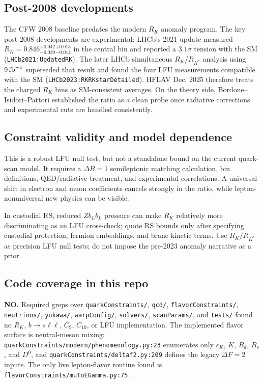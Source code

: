 \subsection*{Post-2008 developments}
The CFW 2008 baseline predates the modern \(R_K\) anomaly program.  The key
post-2008 developments are experimental: LHCb's 2021 update measured
\(R_K=0.846^{+0.042}_{-0.039}{}^{+0.013}_{-0.012}\) in the central bin and
reported a \(3.1\sigma\) tension with the SM
(\texttt{LHCb2021:UpdatedRK}).  The later LHCb simultaneous
\(R_K\)/\(R_{K^*}\) analysis using \(9\,{\rm fb}^{-1}\) superseded that result
and found the four LFU measurements compatible with the SM
(\texttt{LHCb2023:RKRKstarDetailed}).  HFLAV Dec. 2025 therefore treats the
charged \(R_K\) bins as SM-consistent averages.  On the theory side,
Bordone--Isidori--Pattori established the ratio as a clean probe once
radiative corrections and experimental cuts are handled consistently.

\subsection*{Constraint validity and model dependence}
This is a robust LFU null test, but not a standalone bound on the current
quark-scan model.  It requires a \(\Delta B=1\) semileptonic matching
calculation, bin definitions, QED/radiative treatment, and experimental
correlations.  A universal shift in electron and muon coefficients cancels
strongly in the ratio, while lepton-nonuniversal new physics can be visible.

In custodial RS, reduced \(Z b_L b_L\) pressure can make \(R_K\) relatively
more discriminating as an LFU cross-check; quote RS bounds only after
specifying custodial protection, fermion embeddings, and brane kinetic terms.
Use \(R_K/R_{K^*}\) as precision LFU null tests; do not impose the pre-2023
anomaly narrative as a prior.

\subsection*{Code coverage in this repo}
\textbf{NO.}  Required greps over \texttt{quarkConstraints/}, \texttt{qcd/},
\texttt{flavorConstraints/}, \texttt{neutrinos/}, \texttt{yukawa/},
\texttt{warpConfig/}, \texttt{solvers/}, \texttt{scanParams/}, and
\texttt{tests/} found no \(R_K\), \(b\to s\ell\ell\), \(C_9\), \(C_{10}\), or
LFU implementation.  The implemented flavor surface is neutral-meson mixing:
\texttt{quarkConstraints/modern/phenomenology.py:23} enumerates only
\(\epsilon_K\), \(K\), \(B_d\), \(B_s\), and \(D^0\), and
\texttt{quarkConstraints/deltaf2.py:209} defines the legacy \(\Delta F=2\)
inputs.  The only live lepton-flavor routine found is
\texttt{flavorConstraints/muToEGamma.py:75}.

